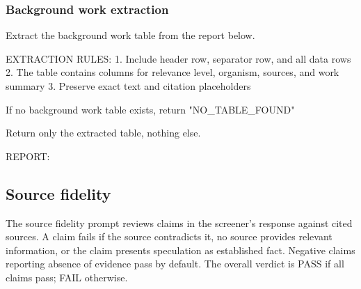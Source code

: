 \documentclass[utf8]{frontiers_suppmat}
\begin{document}
\subsubsection{Background work extraction}

\begin{promptlisting}
Extract the background work table from the report below.

EXTRACTION RULES:
1. Include header row, separator row, and all data rows
2. The table contains columns for relevance level, organism,
   sources, and work summary
3. Preserve exact text and citation placeholders

If no background work table exists, return "NO_TABLE_FOUND"

Return only the extracted table, nothing else.

REPORT:
\end{promptlisting}

\subsection{Source fidelity}

The source fidelity prompt reviews claims in the screener's response against cited sources. A claim fails if the source contradicts it, no source provides relevant information, or the claim presents speculation as established fact. Negative claims reporting absence of evidence pass by default. The overall verdict is PASS if all claims pass; FAIL otherwise.
\end{document}
